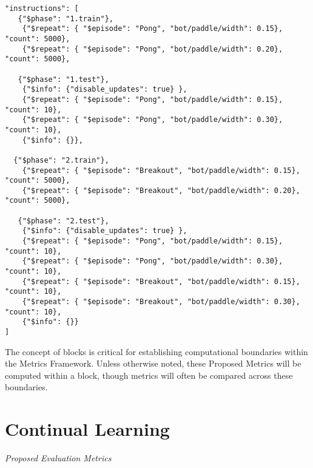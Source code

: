 \begin{small}
\begin{verbatim}
"instructions": [    
   {"$phase": "1.train"}, 
    {"$repeat": { "$episode": "Pong", "bot/paddle/width": 0.15}, "count": 5000}, 
    {"$repeat": { "$episode": "Pong", "bot/paddle/width": 0.20}, "count": 5000}, 

   {"$phase": "1.test"},   
    {"$info": {"disable_updates": true} },
    {"$repeat": { "$episode": "Pong", "bot/paddle/width": 0.15}, "count": 10},  
    {"$repeat": { "$episode": "Pong", "bot/paddle/width": 0.30}, "count": 10},  
    {"$info": {}},
   
  {"$phase": "2.train"}, 
    {"$repeat": { "$episode": "Breakout", "bot/paddle/width": 0.15}, "count": 5000},
    {"$repeat": { "$episode": "Breakout", "bot/paddle/width": 0.20}, "count": 5000}, 

   {"$phase": "2.test"},   
    {"$info": {"disable_updates": true} },
    {"$repeat": { "$episode": "Pong", "bot/paddle/width": 0.15}, "count": 10},
    {"$repeat": { "$episode": "Pong", "bot/paddle/width": 0.30}, "count": 10},
    {"$repeat": { "$episode": "Breakout", "bot/paddle/width": 0.15}, "count": 10},
    {"$repeat": { "$episode": "Breakout", "bot/paddle/width": 0.30}, "count": 10},
    {"$info": {}}
]
\end{verbatim}
\end{small}

The concept of blocks is critical for establishing computational boundaries within the Metrics Framework. Unless otherwise noted, these Proposed Metrics will be computed within a block, though metrics will often be compared across these boundaries.

\section{Continual Learning}

\begin{large}
\textit{Proposed Evaluation Metrics}\\[0.1in]
\end{large}


